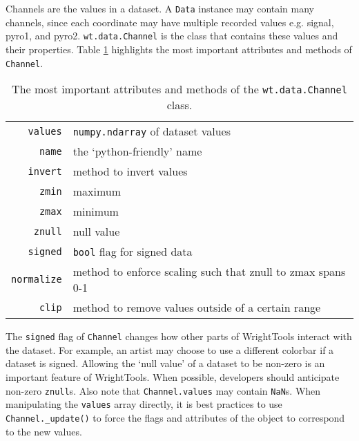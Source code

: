 \documentclass[11pt]{article}
\begin{document}
Channels are the values in a dataset. A \texttt{Data} instance may contain many channels, since each coordinate may have multiple recorded values e.g. signal, pyro1, and pyro2. \texttt{wt.data.Channel} is the class that contains these values and their properties. Table \ref{tab:channel properties} highlights the most important attributes and methods of \texttt{Channel}.
\begin{table}\label{tab:channel properties}
	\begin{center}
		\begin{tabular}{r | l}
			\texttt{values} & \texttt{numpy.ndarray} of dataset values \\ 
			\texttt{name} & the `python-friendly' name \\
			\texttt{invert} & method to invert values \\
			\texttt{zmin} & maximum \\
			\texttt{zmax} & minimum \\
			\texttt{znull} & null value \\
			\texttt{signed} & \texttt{bool} flag for signed data \\
			\texttt{normalize} & method to enforce scaling such that znull to zmax spans 0-1 \\
			\texttt{clip} & method to remove values outside of a certain range
		\end{tabular}
	\end{center}
	\caption{The most important attributes and methods of the \texttt{wt.data.Channel} class.}
\end{table}
The \texttt{signed} flag of \texttt{Channel} changes how other parts of WrightTools interact with the dataset. For example, an artist may choose to use a different colorbar if a dataset is signed. Allowing the `null value' of a dataset to be non-zero is an important feature of WrightTools. When possible, developers should anticipate non-zero \texttt{znull}s. Also note that \texttt{Channel.values} may contain \texttt{NaN}s. When manipulating the \texttt{values} array directly, it is best practices to use \texttt{Channel.\_update()} to force the flags and attributes of the object to correspond to the new values.
\end{document}
